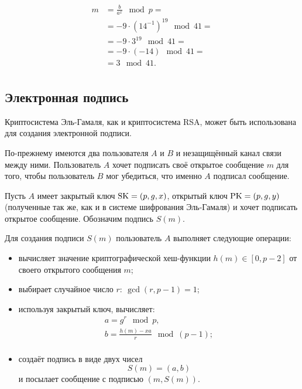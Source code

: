 \begin{enumerate}
\begin{enumerate}
\[\begin{array}{ll}
                    m & = \frac{b}{a^x} \mod p = \\
                    & = -9 \cdot (14^{-1})^{19} \mod 41 = \\
                    & = -9 \cdot 3^{19} \mod 41 = \\
                    & = -9 \cdot (-14) \mod 41 = \\
                    & = 3 \mod 41. \\
                \end{array} \]
        \end{enumerate}
\end{enumerate}

\exampleend
{}

\subsection{Электронная подпись}

Криптосистема Эль-Гамаля, как и криптосистема RSA, может быть использована для создания электронной подписи.

По-прежнему имеются два пользователя $A$ и $B$ и незащищённый канал связи между ними. Пользователь $A$ хочет подписать своё открытое сообщение $m$ для того, чтобы пользователь $B$ мог убедиться, что именно $A$ подписал сообщение.

Пусть $A$ имеет закрытый ключ $\textrm{SK} = (p, g, x)$, открытый ключ $\textrm{PK} = (p, g, y)$ (полученные так же, как и в системе шифрования Эль-Гамаля) и хочет подписать открытое сообщение. Обозначим подпись $S(m)$.

Для создания подписи $S(m)$ пользователь $A$ выполняет следующие операции:
\begin{itemize}
    \item вычисляет значение криптографической хеш-функции $h(m) \in [0,p-2]$ от своего открытого сообщения $m$;
    \item выбирает случайное число $r: ~ \gcd(r, p-1)=1$;
    \item используя закрытый ключ, вычисляет:
        \[ \begin{array}{l}
            a = g^r \mod p, \\
            b = \frac{h(m) - xa}{r} \mod (p-1); \\
        \end{array} \]
    \item создаёт подпись в виде двух чисел
        \[ S(m) = (a, b) \]
        и посылает сообщение с подписью $(m, S(m))$.
\end{itemize}

